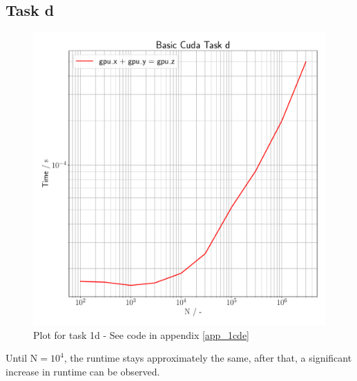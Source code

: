 \subsection{Task d}
\begin{figure}[h]
    \begin{center}
        \includegraphics[width=1\textwidth]{figures/task_1_d.pdf}
        \caption{Plot for task 1d - See code in appendix \ref{app_1cde}}
        \label{task_1_d_plot}
    \end{center}
\end{figure}
Until $\mathrm{N}=10^4$, the runtime stays approximately the same, after that, a significant increase
in runtime can be observed.
\pagebreak

